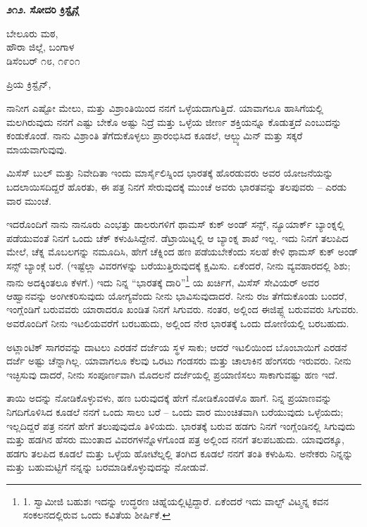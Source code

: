 \begin{center}
\textbf{೨೧೨. ಸೋದರಿ ಕ್ರಿಸ್ಟೈನ್ಗೆ}
\end{center}

\begin{flushright}
ಬೇಲೂರು ಮಠ,\\ಹೌರಾ ಜಿಲ್ಲೆ, ಬಂಗಾಳ\\ಡಿಸೆಂಬರ್ ೧೮, ೧೯೦೧
\end{flushright}

ಪ್ರಿಯ ಕ್ರಿಸ್ಟೈನ್,

ನಾನೀಗ ಎಷ್ಟೋ ಮೇಲು, ಮತ್ತು ವಿಶ್ರಾಂತಿಯಿಂದ ನನಗೆ ಒಳ್ಳೆಯದಾಗುತ್ತಿದೆ. ಯಾವಾಗಲೂ ಹಾಸಿಗೆಯಲ್ಲಿ ಮಲಗಿರುವುದು ನನಗೆ ಎಷ್ಟು ಬೇಕೊ ಅಷ್ಟು ನಿದ್ರೆ ಮತ್ತು ಒಳ್ಳೆಯ ಜೀರ್ಣ ಶಕ್ತಿಯನ್ನೂ ಕೊಡುತ್ತದೆ ಎಂಬುದನ್ನು ಕಂಡುಕೊಂಡೆ. ನಾನು ವಿಶ್ರಾಂತಿ ತೆಗೆದುಕೊಳ್ಳಲು ಪ್ರಾರಂಭಿಸಿದ ಕೂಡಲೆ, ಆಲ್ಬ್ಯುಮಿನ್ ಮತ್ತು ಸಕ್ಕರೆ ಮಾಯವಾಗುವುವು.

ಮಿಸೆಸ್ ಬುಲ್ ಮತ್ತು ನಿವೇದಿತಾ ಇಂದು ಮಾರ್ಸೈಲಿಸ್ನಿಂದ ಭಾರತಕ್ಕೆ ಹೊರಡುವರು ಅವರ ಯೋಜನೆಯನ್ನು ಬದಲಾಯಿಸದಿದ್ದರೆ ಹೊರತು, ಈ ಪತ್ರ ನಿನಗೆ ಸೇರುವುದಕ್ಕೆ ಮುಂಚೆ ಅವರು ಭಾರತವನ್ನು ತಲಪುವರು – ಎರಡು ವಾರ ಮುಂಚೆ.

ಇದರೊಂದಿಗೆ ನಾನು ನಾನೂರು ಎಂಭತ್ತು ಡಾಲರುಗಳಿಗೆ ಥಾಮಸ್ ಕುಕ್ ಅಂಡ್ ಸನ್ಸ್, ನ್ಯೂಯಾರ್ಕ್ ಬ್ಯಾಂಕ್ನಲ್ಲಿ ಪಡೆಯುವಂತೆ ನಿನಗೆ ಒಂದು ಚೆಕ್ ಕಳುಹಿಸಿದ್ದೇನೆ. ಡೆಟ್ರಾಯಿಟ್ನಲ್ಲಿ ಆ ಬ್ಯಾಂಕ್ನ ಶಾಖೆ ಇಲ್ಲ. ಇದು ನಿನಗೆ ತಲುಪಿದ ಮೇಲೆ, ಚೆಕ್ನ ಮೊಬಲಗನ್ನು ನಮೂದಿಸಿ, ಹೇಗೆ ಚೆಕ್ನಿಂದ ಹಣ ಪಡೆಯಬೇಕೆಂದು ಸಲಹೆ ಕೇಳಿ ಥಾಮಸ್ ಕುಕ್ ಅಂಡ್ ಸನ್ಸ್ ಬ್ಯಾಂಕ್ಗೆ ಬರೆ. (ಇಷ್ಟೆಲ್ಲಾ ವಿವರಗಳನ್ನು ಬರೆಯುತ್ತಿರುವುದಕ್ಕೆ ಕ್ಷಮಿಸು. ಏಕೆಂದರೆ, ನೀನು ವ್ಯವಹಾರದಲ್ಲಿ ಶಿಶು; ನಾನು ಅದಕ್ಕಿಂತಲೂ ಕೆಳಗೆ.) ಇದು ನಿನ್ನ “ಭಾರತಕ್ಕೆ ದಾರಿ”\footnote{1. ಸ್ವಾಮೀಜಿ ಬಹುಶಃ ಇದನ್ನು ಉದ್ಧರಣ ಚಿಹ್ನೆಯಲ್ಲಿಟ್ಟಿದ್ದಾರೆ. ಏಕೆಂದರೆ ಇದು ವಾಲ್ಟ್ ವಿಟ್ಮನ್ನ  ಕವನ ಸಂಕಲನದಲ್ಲಿರುವ ಒಂದು ಕವಿತೆಯ ಶೀರ್ಷಿಕೆ.} ಯ ಖರ್ಚಿಗೆ, ಮಿಸೆಸ್ ಸೇವಿಯರ್ ಅವರ ಆಹ್ವಾನವನ್ನು ಅಂಗೀಕರಿಸುವುದು ಯೋಗ್ಯವೆಂದು ನೀನು ಭಾವಿಸುವುದಾದರೆ. ನೀನು ರಜ ತೆಗೆದುಕೊಂಡು ಬಂದರೆ, ಇಂಗ್ಲೆಂಡಿಗೆ ಬರುವವರು ಯಾರಾದರೂ ಖಂಡಿತ ನಿನಗೆ ಸಿಗುವರು. ನಂತರ, ಅಲ್ಲಿಂದ ಈಜಿಪ್ಟ್ಗೆ ಬರುವವರು ಸಿಗುವರು. ಅವರೊಂದಿಗೆ ನೀನು ಇಟಲಿಯವರೆಗೆ ಬರಬಹುದು, ಅಲ್ಲಿಂದ ನೇರ ಭಾರತಕ್ಕೆ ಒಂದು ದೋಣಿಯಲ್ಲಿ ಬರಬಹುದು.

ಅಟ್ಲಾಂಟಿಕ್ ಸಾಗರವನ್ನು ದಾಟಲು ಎರಡನೆ ದರ್ಜೆಯ ಸ್ಥಳ ಸಾಕು; ಆದರೆ ಇಟಲಿಯಿಂದ ಬೊಂಬಾಯಿಗೆ ಎರಡನೆ ದರ್ಜೆ ಅಷ್ಟು ಚೆನ್ನಾಗಿಲ್ಲ. ಯಾವಾಗಲೂ ಕೆಲವು ಒರಟು ಗಂಡಸರು ಮತ್ತು ಚಾಲಾಕಿನ ಹೆಂಗಸರು ಇರುವರು. ನೀನು ಇಚ್ಛಿಸುವು ದಾದರೆ, ನೀನು ಸಂಪೂರ್ಣವಾಗಿ ಮೊದಲನೆ ದರ್ಜೆಯಲ್ಲಿ ಪ್ರಯಾಣಿಸಲು ಸಾಕಾಗುವಷ್ಟು ಹಣ ಇದೆ.

ತಾಯಿ ಅದನ್ನು ನೋಡಿಕೊಳ್ಳುವಳು, ಹಣ ಬರುವುದಕ್ಕೆ ಹೇಗೆ ನೋಡಿಕೊಂಡಳೊ ಹಾಗೆ. ನಿನ್ನ ಪ್ರಯಾಣವನ್ನು ನಿಗದಿಗೊಳಿಸಿದ ಕೂಡಲೆ ನನಗೆ ಒಂದು ಸಾಲು ಬರೆ – ಒಂದು ವಾರ ಮುಂಚಿತವಾಗಿ ಬರೆಯುವುದು ಒಳ್ಳೆಯದು; ಇಲ್ಲದಿದ್ದರೆ ಪತ್ರ ನನಗೆ ಹೇಗೆ ತಲುಪುವುದೊ ತಿಳಿಯದು. ಭಾರತಕ್ಕೆ ಬರುವ ಹಡಗು ನಿನಗೆ ಇಂಗ್ಲೆಂಡಿನಲ್ಲಿ ಸಿಗುವುದು ಮತ್ತು ಹಡಗಿನ ಹೆಸರು ಮುಂತಾದ ವಿವರಗಳನ್ನೊಳಗೊಂಡ ಪತ್ರ ಅಲ್ಲಿಂದ ನನಗೆ ತಲಪಬಹುದು. ಯಾವುದಕ್ಕೂ, ಹಡಗು ತಲಪಿದ ಕೂಡಲೆ ಮತ್ತು ಒಳ್ಳೆಯ ಹೋಟೆಲ್ನಲ್ಲಿ ತಂಗಿದ ಕೂಡಲೆ ನನಗೆ ತಂತಿ ಕಳುಹಿಸು. ಅನೇಕರು ನಿನ್ನನ್ನು ಮತ್ತು ಬಹುಮಟ್ಟಿಗೆ ನನ್ನನ್ನು ಬರಮಾಡಿಕೊಳ್ಳುವುದನ್ನು ನೋಡುವೆ.

